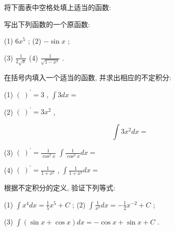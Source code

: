 \documentclass[lang=cn,newtx,10pt,scheme=chinese]{elegantbook}
\begin{document}
\begin{problemset}[练习]

\item 将下面表中空格处填上适当的函数:

\begin{center}
\end{center}

\item 写出下列函数的一个原函数:

(1) \(6{x}^{5}\) ; (2) \(- \sin x\) ;

(3) \(\frac{1}{2\sqrt{x}}\) (4) \(\frac{1}{\sqrt{1 - {x}^{2}}}\) .

\item 在括号内填入一个适当的函数, 并求出相应的不定积分:

(1) \({\left( \;\right) }^{\prime } = 3\) , \(\int {3dx} =\)

(2) \({\left( \;\right) }^{\prime } = 3{x}^{2}\) ,

\[
\int 3{x}^{2}{dx} =
\]

(3) \({\left( \;\right) }^{\prime } = \frac{1}{{\cos }^{2}x}\) \(\int \frac{1}{{\cos }^{2}x}{dx} =\)

(4) \({\left( \;\right) }^{\prime } = \frac{1}{1 + {x}^{2}}\) , \(\int \frac{1}{1 + {x}^{2}}{dx} =\)

\item 根据不定积分的定义, 验证下列等式:

(1) \(\int {x}^{4}{dx} = \frac{1}{5}{x}^{5} + C\) ; (2) \(\int \frac{1}{{x}^{3}}{dx} = - \frac{1}{2}{x}^{-2} + C\) ;

(3) \(\int \left( {\sin x + \cos x}\right) {dx} = - \cos x + \sin x + C\) .

\end{problemset}
\end{document}

